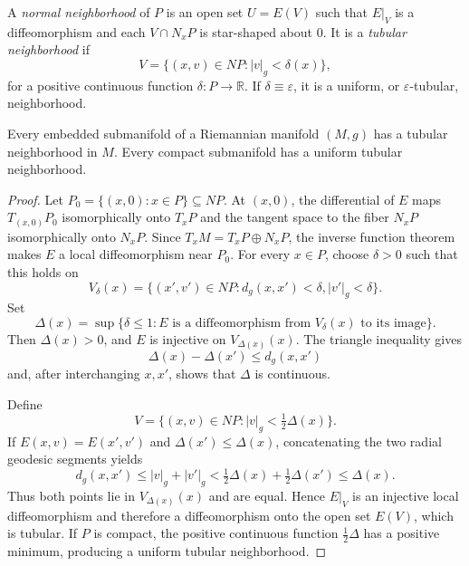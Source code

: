 A \emph{normal neighborhood} of $P$ is an open set $U=E(V)$ such that
$E|_V$ is a diffeomorphism and each $V\cap N_xP$ is star-shaped about $0$.  It
is a \emph{tubular neighborhood} if
\begin{equation}
V = \{(x, v) \in NP : |v|_g < \delta(x)\}, \tag{5.21}
\end{equation}
for a positive continuous function $\delta:P\to\mathbb R$.  If
$\delta\equiv\varepsilon$, it is a uniform, or $\varepsilon$-tubular,
neighborhood.

\begin{theorem}
\label{thm:tubular-neighborhood}

Every embedded submanifold of a Riemannian manifold $(M,g)$ has a tubular
neighborhood in $M$.  Every compact submanifold has a uniform tubular
neighborhood.

\begin{proof}
\sketch
Let $P_0=\{(x,0):x\in P\}\subseteq NP$.  At $(x,0)$, the differential of
$E$ maps $T_{(x,0)}P_0$ isomorphically onto $T_xP$ and the tangent space to
the fiber $N_xP$ isomorphically onto $N_xP$.  Since
$T_xM=T_xP\oplus N_xP$, the inverse function theorem makes $E$ a local
diffeomorphism near $P_0$.  For every $x\in P$, choose $\delta>0$ such that
this holds on
\begin{equation}
V_\delta(x) = \{(x', v') \in NP : d_g(x,x') < \delta, |v'|_g < \delta\}.
\tag{5.22}
\end{equation}
Set
\begin{equation}
\Delta(x) = \sup\{\delta \leq 1 : E \text{ is a diffeomorphism from }
V_\delta(x) \text{ to its image}\}. \tag{5.23}
\end{equation}
Then $\Delta(x)>0$, and $E$ is injective on $V_{\Delta(x)}(x)$.  The triangle
inequality gives
\begin{equation}
\Delta(x) - \Delta(x') \leq d_g(x, x') \tag{5.24}
\end{equation}
and, after interchanging $x,x'$, shows that $\Delta$ is continuous.

Define
\[
V=\{(x,v)\in NP:|v|_g<\tfrac12\Delta(x)\}.
\]
If $E(x,v)=E(x',v')$ and $\Delta(x')\leq\Delta(x)$, concatenating the two
radial geodesic segments yields
\[
d_g(x,x')\leq |v|_g+|v'|_g
<\tfrac12\Delta(x)+\tfrac12\Delta(x')\leq\Delta(x).
\]
Thus both points lie in $V_{\Delta(x)}(x)$ and are equal.  Hence $E|_V$ is an
injective local diffeomorphism and therefore a diffeomorphism onto the open
set $E(V)$, which is tubular.  If $P$ is compact, the positive continuous
function $\tfrac12\Delta$ has a positive minimum, producing a uniform
tubular neighborhood.
\end{proof}
\end{theorem}


